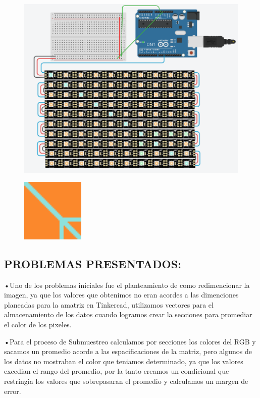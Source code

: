 \documentclass{article}
\begin{document}
\begin{figure}[h]
\includegraphics[width=12cm]{estruc.PNG}
\centering
\caption{}
\label{fig:tipos}
\end{figure}

\begin{figure}[h]
\includegraphics[width=3cm]{prueba.png}
\centering
\caption{}
\label{fig:tipos}
\end{figure}



\vspace{2cm}
\begin{center}
\Huge
\section{PROBLEMAS PRESENTADOS: }
\end{center}

•Uno de los problemas iniciales fue el planteamiento de como redimencionar la imagen, ya que los valores que obtenimos no eran acordes a las dimenciones  planeadas para la amatriz en Tinkercad, utilizamos vectores para el almacenamiento de  los datos cuando logramos crear la secciones para promediar el color de los pixeles.

 \vspace{1cm}
 
•Para el proceso de Submuestreo calculamos por secciones los colores del RGB y sacamos un promedio acorde a las espacificaciones de la matriz, pero algunos de los datos no mostraban el color que teniamos determinado, ya que los valores excedian el rango del promedio, por la tanto creamos un condicional que restringia los valores que sobrepasaran el promedio y calculamos un margen de error. 
\end{document}
